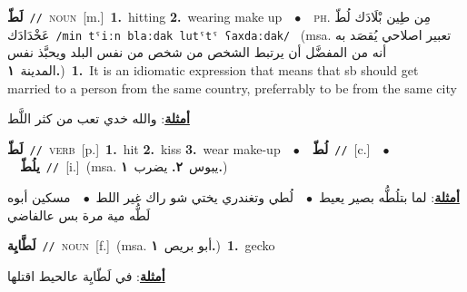 \documentclass[10pt,a4paper,twoside]{article} %
\begin{document}
\begin{multicols}{2}
{\setlength\topsep{0pt}\textbf{\foreignlanguage{arabic}{لَطّ}}\ {\color{gray}\texttt{//}\color{black}}\ \textsc{noun}\ [m.]\ \textbf{1.}~hitting  \textbf{2.}~wearing make up\ \ $\bullet$\ \ \textsc{ph.} \color{gray} \foreignlanguage{arabic}{مِن طِين بْلَادَك لُطّ عَخْدَادَك}\color{black}\ {\color{gray}\texttt{/{\sffamily min tˤiːn blaːdak lutˤtˤ ʕaxdaːdak}/}\color{black}}\ \color{gray} (msa. \foreignlanguage{arabic}{تعبير اصلاحي يُقصَد به أنه من المفضَّل أن يرتبط الشخص من شخص من نفس البلد ويحبَّذ نفس المدينة}~\foreignlanguage{arabic}{\textbf{١.}})\color{black}\ \textbf{1.}~It is an idiomatic expression that means  that sb should get married to a person from the same country, preferrably to be from the same city\  \begin{flushright}\color{gray}\foreignlanguage{arabic}{\textbf{\underline{\foreignlanguage{arabic}{أمثلة}}}: والله خدي تعب من كثر اللَّط}\end{flushright}\color{black}} \vspace{2mm}

{\setlength\topsep{0pt}\textbf{\foreignlanguage{arabic}{لَطّ}}\ {\color{gray}\texttt{//}\color{black}}\ \textsc{verb}\ [p.]\ \textbf{1.}~hit  \textbf{2.}~kiss  \textbf{3.}~wear make-up\ \ $\bullet$\ \ \setlength\topsep{0pt}\textbf{\foreignlanguage{arabic}{لُطّ}}\ {\color{gray}\texttt{//}\color{black}}\ [c.]\ \ $\bullet$\ \ \setlength\topsep{0pt}\textbf{\foreignlanguage{arabic}{يلُطّ}}\ {\color{gray}\texttt{//}\color{black}}\ [i.]\ \color{gray}(msa. \foreignlanguage{arabic}{يبوس}~\foreignlanguage{arabic}{\textbf{٢.}}  \foreignlanguage{arabic}{يضرب}~\foreignlanguage{arabic}{\textbf{١.}})\color{black}\  \begin{flushright}\color{gray}\foreignlanguage{arabic}{\textbf{\underline{\foreignlanguage{arabic}{أمثلة}}}: لما بتلُطُّه بصير يعيط\ $\bullet$\ \  لُطي وتغندري يختي شو راك غير اللط\ $\bullet$\ \  مسكين أبوه لَطُّه مية مرة بس عالفاضي}\end{flushright}\color{black}} \vspace{2mm}

{\setlength\topsep{0pt}\textbf{\foreignlanguage{arabic}{لَطَّايِة}}\ {\color{gray}\texttt{//}\color{black}}\ \textsc{noun}\ [f.]\ \color{gray}(msa. \foreignlanguage{arabic}{أبو بريص}~\foreignlanguage{arabic}{\textbf{١.}})\color{black}\ \textbf{1.}~gecko\  \begin{flushright}\color{gray}\foreignlanguage{arabic}{\textbf{\underline{\foreignlanguage{arabic}{أمثلة}}}: في لَطّايِة عالحيط اقتلها}\end{flushright}\color{black}} \vspace{2mm}


\end{multicols}
\end{document}
